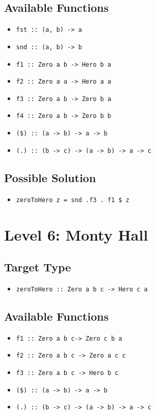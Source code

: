 \subsection*{Available Functions} 
\begin{itemize}
    \item \texttt{fst :: (a, b) -> a}
    \item \texttt{snd :: (a, b) -> b}
    \item \texttt{f1 :: Zero a b -> Hero b a}
    \item \texttt{f2 :: Zero a a -> Hero a a}
    \item \texttt{f3 :: Zero a b -> Zero b a}
    \item \texttt{f4 :: Zero a b -> Zero b b}
    \item \texttt{(\$) :: (a -> b) -> a -> b}
    \item \texttt{(.) :: (b -> c) -> (a -> b) -> a -> c}
\end{itemize}

\subsection*{Possible Solution} 
\begin{itemize}
    \item \texttt{zeroToHero z = snd .f3 . f1 \$ z}
\end{itemize}


\section{Level 6: Monty Hall}
\subsection*{Target Type } 
\begin{itemize}
    \item \texttt{zeroToHero :: Zero a b c -> Hero c a}
\end{itemize}

\subsection*{Available Functions} 
\begin{itemize}
    \item \texttt{f1 :: Zero a b c-> Zero c b a}
    \item \texttt{f2 :: Zero a b c -> Zero a c c}
    \item \texttt{f3 :: Zero a b c -> Hero b c}
    \item \texttt{(\$) :: (a -> b) -> a -> b}
    \item \texttt{(.) :: (b -> c) -> (a -> b) -> a -> c}
\end{itemize}

